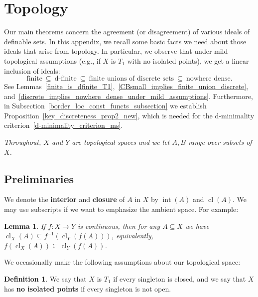 \documentclass[11pt]{amsart}
\theoremstyle{plain}
\newtheorem{lemma}[thm]{Lemma}
\theoremstyle{definition}
\newtheorem{definition}[thm]{Definition}
\numberwithin{equation}{section}
\newcommand\0{\varnothing}
\DeclareMathOperator\cl{cl}
\begin{document}
\appendix

\section{Topology}\label{sec_appendix}

\noindent
Our main theorems concern the agreement (or disagreement) of various ideals of definable sets. In this appendix, we recall some basic facts we need about those ideals that arise from topology. In particular, we observe that under mild topological assumptions (e.g., if $X$ is $T_1$ with no isolated points), we get a linear inclusion of ideals:
\[
\text{finite} \ \subseteq \ \text{d-finite} \ \subseteq \ \text{finite unions of discrete sets} \ \subseteq \ 
\text{nowhere dense}. \]
See Lemmas~\ref{finite_is_dfinite_T1},~\ref{CBsmall_implies_finite_union_discrete}, and~\ref{discrete_implies_nowhere_dense_under_mild_assumptions}.
Furthermore, in Subsection~\ref{border_loc_const_functs_subsection} we establish Proposition~\ref{key_discreteness_prop2_new}, which is needed for the d-minimality criterion~\ref{d-minimality_criterion_ms}.


\medskip\noindent
\emph{Throughout, $X$ and $Y$ are topological spaces and we let $A,B$ range over subsets of $X$.}

\subsection{Preliminaries}
We denote the \textbf{interior} and \textbf{closure} of $A$ in $X$ by $\operatorname{int}(A)$ and $\operatorname{cl}(A)$. We may use subscripts if we want to emphasize the ambient space. For example:

\begin{lemma}\label{cont_map_bigger_closure}
If $f\colon X\to Y$ is continuous, then for any $A\subseteq X$ we have $\operatorname{cl}_X(A)\subseteq f^{-1}(\operatorname{cl}_Y(f(A)))$, equivalently, $f(\cl_X(A))\subseteq\cl_Y(f(A))$.
\end{lemma}


\noindent
We occasionally make the following assumptions about our topological space:

\begin{definition}
We say that $X$ is $T_1$ if every singleton is closed, and we say that $X$ has \textbf{no isolated points} if every singleton is not open.
\end{definition}
\end{document}
